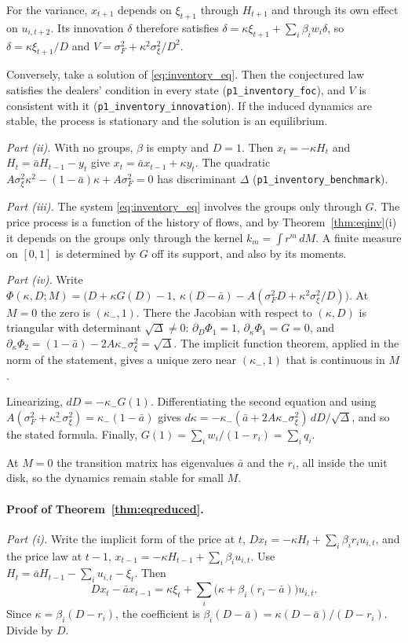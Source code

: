 \documentclass[12pt]{article}
\theoremstyle{definition}
\theoremstyle{remark}
\begin{document}
For the variance, $x_{t+1}$ depends on $\xi_{t+1}$ through $H_{t+1}$ and through its own effect on $u_{i,t+2}$. Its innovation $\delta$ therefore satisfies $\delta=\kappa\xi_{t+1}+\sum_i\beta_iw_i\delta$, so $\delta=\kappa\xi_{t+1}/D$ and $V=\sigma_F^2+\kappa^2\sigma_\xi^2/D^2$.

Conversely, take a solution of \eqref{eq:inventory_eq}. Then the conjectured law satisfies the dealers' condition in every state (\nolinkurl{p1_inventory_foc}), and $V$ is consistent with it (\nolinkurl{p1_inventory_innovation}). If the induced dynamics are stable, the process is stationary and the solution is an equilibrium.

\emph{Part (ii).} With no groups, $\beta$ is empty and $D=1$. Then $x_t=-\kappa H_t$ and $H_t=\bar aH_{t-1}-y_t$ give $x_t=\bar ax_{t-1}+\kappa y_t$. The quadratic $A\sigma_\xi^2\kappa^2-(1-\bar a)\kappa+A\sigma_F^2=0$ has discriminant $\Delta$ (\nolinkurl{p1_inventory_benchmark}).

\emph{Part (iii).} The system \eqref{eq:inventory_eq} involves the groups only through $G$. The price process is a function of the history of flows, and by Theorem~\ref{thm:eqinv}(i) it depends on the groups only through the kernel $k_m=\int r^m\,dM$. A finite measure on $[0,1]$ is determined by $G$ off its support, and also by its moments.

\emph{Part (iv).} Write $\Phi(\kappa,D;M)=\bigl(D+\kappa G(D)-1,\ \kappa(D-\bar a)-A(\sigma_F^2D+\kappa^2\sigma_\xi^2/D)\bigr)$. At $M=0$ the zero is $(\kappa_-,1)$. There the Jacobian with respect to $(\kappa,D)$ is triangular with determinant $\sqrt\Delta\ne0$: $\partial_D\Phi_1=1$, $\partial_\kappa\Phi_1=G=0$, and $\partial_\kappa\Phi_2=(1-\bar a)-2A\kappa_-\sigma_\xi^2=\sqrt\Delta$. The implicit function theorem, applied in the norm of the statement, gives a unique zero near $(\kappa_-,1)$ that is continuous in $M$.

Linearizing, $dD=-\kappa_-G(1)$. Differentiating the second equation and using $A(\sigma_F^2+\kappa_-^2\sigma_\xi^2)=\kappa_-(1-\bar a)$ gives $d\kappa=-\kappa_-(\bar a+2A\kappa_-\sigma_\xi^2)\,dD/\sqrt\Delta$, and so the stated formula. Finally, $G(1)=\sum_iw_i/(1-r_i)=\sum_iq_i$.

At $M=0$ the transition matrix has eigenvalues $\bar a$ and the $r_i$, all inside the unit disk, so the dynamics remain stable for small $M$.

\paragraph{Proof of Theorem~\ref{thm:eqreduced}.}
\emph{Part (i).} Write the implicit form of the price at $t$, $Dx_t=-\kappa H_t+\sum_i\beta_ir_iu_{i,t}$, and the price law at $t-1$, $x_{t-1}=-\kappa H_{t-1}+\sum_i\beta_iu_{i,t}$. Use $H_t=\bar aH_{t-1}-\sum_iu_{i,t}-\xi_t$. Then
\[
 Dx_t-\bar ax_{t-1}=\kappa\xi_t+\sum_i\bigl(\kappa+\beta_i(r_i-\bar a)\bigr)u_{i,t}.
\]
Since $\kappa=\beta_i(D-r_i)$, the coefficient is $\beta_i(D-\bar a)=\kappa(D-\bar a)/(D-r_i)$. Divide by $D$.
\end{document}
